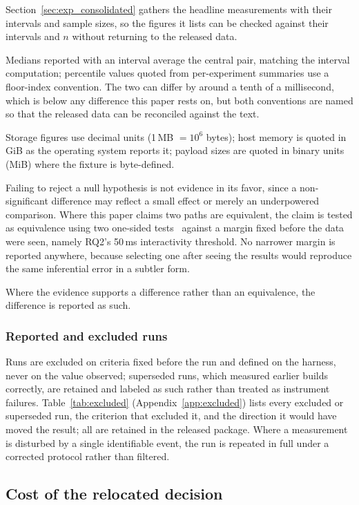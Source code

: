 \documentclass[preprint,12pt]{elsarticle}
\begin{document}
Section~\ref{sec:exp_consolidated} gathers the headline measurements with
their intervals and sample sizes, so the figures it lists can be checked
against their intervals and $n$ without returning to the released data.

Medians reported with an interval average the central pair, matching the
interval computation; percentile values quoted from per-experiment summaries use
a floor-index convention. The two can differ by around a tenth of a millisecond,
which is below any difference this paper rests on, but both conventions are
named so that the released data can be reconciled against the text.

Storage figures use decimal units (1\,MB $= 10^6$ bytes); host memory is
quoted in GiB as the operating system reports it; payload sizes are quoted in
binary units (MiB) where the fixture is byte-defined.

Failing to reject a null hypothesis is not evidence in its favor, since a
non-significant difference may reflect a small effect or merely an
underpowered comparison. Where this paper claims two paths are equivalent, the
claim is tested as equivalence using two one-sided
tests~\cite{schuirmann1987tost} against a margin fixed before the data were
seen, namely RQ2's 50\,ms interactivity threshold. No narrower margin is
reported anywhere, because selecting one after seeing the results would
reproduce the same inferential error in a subtler form.

Where the evidence supports a difference rather than an equivalence, the
difference is reported as such.

\subsubsection*{Reported and excluded runs}

Runs are excluded on criteria fixed before the run and defined on the
harness, never on the value observed; superseded runs, which measured earlier
builds correctly, are retained and labeled as such rather than treated as
instrument failures. Table~\ref{tab:excluded} (Appendix~\ref{app:excluded})
lists every excluded or
superseded run, the criterion that excluded it, and the direction it would
have moved the result; all are retained in the released package. Where a
measurement is disturbed by a single identifiable event, the run is repeated
in full under a corrected protocol rather than filtered.


\subsection{Cost of the relocated decision}
\end{document}
